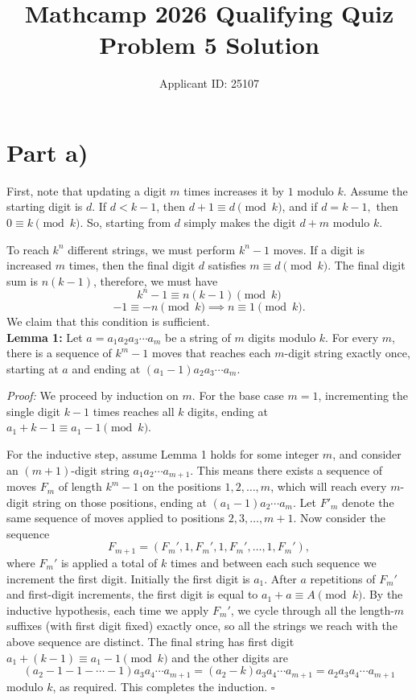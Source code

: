 \documentclass{article}
\title{Mathcamp 2026 Qualifying Quiz Problem 5 Solution}
\author{Applicant ID: 25107}
\date{}
\begin{document}
	
	\maketitle
	
	\section*{Part a)}
    First, note that updating a digit $m$ times increases it by $1$ modulo $k$. Assume the starting digit is $d$. If $d < k - 1$, then $d + 1 \equiv d \pmod k$, and if $d = k - 1,$ then $0 \equiv k\pmod k$. So, starting from $d$ simply makes the digit $d + m$ modulo $k$. 
    
    To reach $k^n$ different strings, we must perform $k^n - 1$ moves. If a digit is increased $m$ times, then the final digit $d$ satisfies $m\equiv d\pmod k$. The final digit sum is $n(k - 1)$, therefore, we must have
    $$k^n - 1\equiv n(k - 1) \pmod k$$
    $$-1\equiv -n \pmod k \implies n\equiv 1\pmod k.$$
    We claim that this condition is sufficient. \\
    
    \textbf{Lemma 1:} Let $a = a_1a_2a_3\cdots a_m$ be a string of $m$ digits modulo $k$. For every $m$, there is a sequence of $k^m - 1$ moves that reaches each $m$-digit string exactly once, starting at $a$ and ending at $(a_1 - 1)a_2a_3\cdots a_m$.
    
    \textit{Proof:} We proceed by induction on $m$. For the base case $m = 1$, incrementing the single digit $k - 1$ times reaches all $k$ digits, ending at $a_1 + k - 1 \equiv a_1 - 1\pmod k$.

    For the inductive step, assume Lemma 1 holds for some integer $m$, and consider an $(m + 1)$-digit string $a_1a_2\cdots a_{m + 1}$. This means there exists a sequence of moves $F_m$ of length $k^m - 1$ on the positions $1, 2, \dots, m$, which will reach every $m$-digit string on those positions, ending at $(a_1 - 1)a_2\cdots a_m$. Let $F'_m$ denote the same sequence of moves applied to positions $2, 3, \dots, m + 1$. Now consider the sequence
    $$F_{m + 1} = (F_m', 1, F_m', 1, F_m', \dots, 1, F_m'),$$
    where $F_m'$ is applied a total of $k$ times and between each such sequence we increment the first digit. Initially the first digit is $a_1$. After $a$ repetitions of $F_m'$ and first-digit increments, the first digit is equal to $a_1 + a \equiv A\pmod k$. By the inductive hypothesis, each time we apply $F_m'$, we cycle through all the length-$m$ suffixes (with first digit fixed) exactly once, so all the strings we reach with the above sequence are distinct. 
    The final string has first digit $a_1 + (k - 1)\equiv a_1 - 1\pmod k$ and the other digits are $$(a_2 - 1 - 1 - \cdots - 1)a_3a_4\cdots a_{m + 1} = (a_2 - k)a_3a_4\cdots a_{m + 1} = a_2a_3a_4\cdots a_{m + 1}$$
    modulo $k$, as required. This completes the induction. $\square$\\
\end{document}
